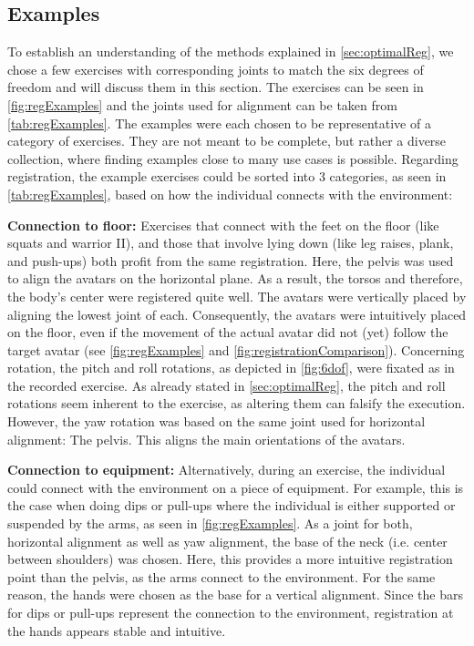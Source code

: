 \subsection*{Examples \label{sec:regExamples}}
To establish an understanding of the methods explained in \autoref{sec:optimalReg}, we chose a few exercises with corresponding joints to match the six degrees of freedom and will discuss them in this section. The exercises can be seen in \autoref{fig:regExamples} and the joints used for alignment can be taken from \autoref{tab:regExamples}. The examples were each chosen to be representative of a category of exercises. They are not meant to be complete, but rather a diverse collection, where finding examples close to many use cases is possible. Regarding registration, the example exercises could be sorted into 3 categories, as seen in \autoref{tab:regExamples}, based on how the individual connects with the environment:

\textbf{Connection to floor:}
Exercises that connect with the feet on the floor (like squats and warrior II), and those that involve lying down (like leg raises, plank, and push-ups) both profit from the same registration. Here, the pelvis was used to align the avatars on the horizontal plane. As a result, the torsos and therefore, the body's center were registered quite well. The avatars were vertically placed by aligning the lowest joint of each. Consequently, the avatars were intuitively placed on the floor, even if the movement of the actual avatar did not (yet) follow the target avatar (see \autoref{fig:regExamples} and \autoref{fig:registrationComparison}). Concerning rotation, the pitch and roll rotations, as depicted in \autoref{fig:6dof}, were fixated as in the recorded exercise. As already stated in \autoref{sec:optimalReg}, the pitch and roll rotations seem inherent to the exercise, as altering them can falsify the execution. However, the yaw rotation was based on the same joint used for horizontal alignment: The pelvis. This aligns the main orientations of the avatars.

\textbf{Connection to equipment:}
Alternatively, during an exercise, the individual could connect with the environment on a piece of equipment. For example, this is the case when doing dips or pull-ups where the individual is either supported or suspended by the arms, as seen in \autoref{fig:regExamples}. As a joint for both, horizontal alignment as well as yaw alignment, the base of the neck (i.e. center between shoulders) was chosen. Here, this provides a more intuitive registration point than the pelvis, as the arms connect to the environment. For the same reason, the hands were chosen as the base for a vertical alignment. Since the bars for dips or pull-ups represent the connection to the environment, registration at the hands appears stable and intuitive.

